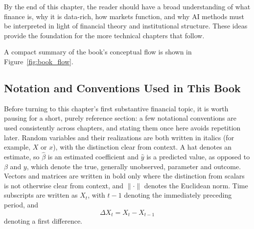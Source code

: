 \documentclass[../ai_in_finance]{subfiles}
\begin{document}
By the end of this chapter, the reader should have a broad understanding of what finance is, why it is data-rich, how markets function, and why AI methods must be interpreted in light of financial theory and institutional structure. These ideas provide the foundation for the more technical chapters that follow.

A compact summary of the book's conceptual flow is shown in Figure~\ref{fig:book_flow}.

\begin{figure}[htbp]
\centering
\begin{lrbox}{\bookmeasuredbox}
\end{lrbox}
\ifdim\wd\bookmeasuredbox<0.65\linewidth
\setlength{\bookcapwidth}{0.65\linewidth}
\else
\setlength{\bookcapwidth}{\wd\bookmeasuredbox}
\fi
{}
\end{figure}

\subsection{Notation and Conventions Used in This Book}

Before turning to this chapter's first substantive financial topic, it is worth pausing for a short, purely reference section: a few notational conventions are used consistently across chapters, and stating them once here avoids repetition later. Random variables and their realizations are both written in italics (for example, $X$ or $x$), with the distinction clear from context. A hat denotes an estimate, so $\hat\beta$ is an estimated coefficient and $\hat y$ is a predicted value, as opposed to $\beta$ and $y$, which denote the true, generally unobserved, parameter and outcome. Vectors and matrices are written in bold only where the distinction from scalars is not otherwise clear from context, and $\|\cdot\|$ denotes the Euclidean norm. Time subscripts are written as $X_t$, with $t-1$ denoting the immediately preceding period, and
$$\Delta X_t = X_t - X_{t-1}$$
denoting a first difference.
\end{document}
